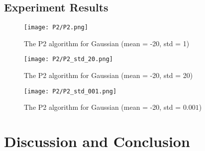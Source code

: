 \subsection{Experiment Results}

\begin{figure*}[h!]
	\texttt{[image: P2/P2.png]}
	\caption{The P2 algorithm for Gaussian (mean = -20, std = 1)}
\end{figure*}
\begin{figure*}[h!]
	\texttt{[image: P2/P2\_std\_20.png]}
	\caption{The P2 algorithm for Gaussian (mean = -20, std = 20)}
\end{figure*}
\begin{figure*}[h!]
	\texttt{[image: P2/P2\_std\_001.png]}
	\caption{The P2 algorithm for Gaussian (mean = -20, std = $0.001$)}
\end{figure*}
\section{Discussion and Conclusion}
\label{sec: multi_discussion}